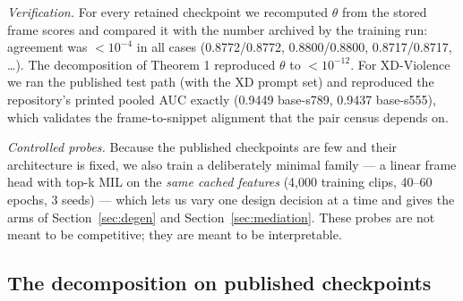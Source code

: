 \documentclass[number,preprint,12pt]{elsarticle}
\begin{document}
\emph{Verification.} For every retained checkpoint we recomputed \(\theta\) from the stored
frame scores and compared it with the number archived by the training run:
agreement was \(<10^{-4}\) in all cases (0.8772/0.8772, 0.8800/0.8800,
0.8717/0.8717, \dots{}). The decomposition of Theorem 1 reproduced \(\theta\) to
\(<10^{-12}\). For XD-Violence we ran the published test path (with
the XD prompt set) and reproduced the repository's printed pooled AUC exactly
(0.9449 base-s789, 0.9437 base-s555), which validates the frame-to-snippet
alignment that the pair census depends on.

\emph{Controlled probes.} Because the published checkpoints are few and their
architecture is fixed, we also train a deliberately minimal family --- a linear
frame head with top-k MIL on the \emph{same cached features} (4,000 training clips,
40--60 epochs, 3 seeds) --- which lets us vary one design decision at a time and
gives the arms of Section~\ref{sec:degen} and Section~\ref{sec:mediation}. These probes are not meant to be competitive;
they are meant to be interpretable.

\subsection{The decomposition on published checkpoints}\label{sec:decomp}
\end{document}
